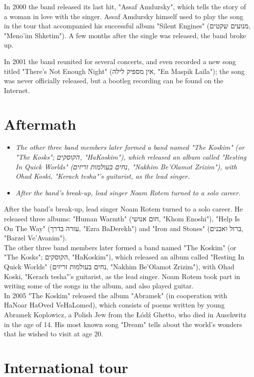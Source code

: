 In 2000 the band released its last hit, "Assaf Amdursky", which tells
the story of a woman in love with the singer. Assaf Amdursky himself
used to play the song in the tour that accompanied his successful album
"Silent Engines" (מנועים שקטים, "Meno'im Shketim"). A few months after
the single was released, the band broke up.

In 2001 the band reunited for several concerts, and even recorded a new
song titled "There's Not Enough Night" (אין מספיק לילה, "En Maspik
Laïla"); the song was never officially released, but a bootleg recording
can be found on the Internet.

\section{Aftermath}\label{aftermath}

\begin{itemize}
\item
  \emph{The other three band members later formed a band named "The
  Koskim" (or "The Kosks"; הקוסקים, "HaKoskim"), which released an album
  called "Resting In Quick Worlds" (נחים בעולמות זריזים, "Nakhim
  Be'Olamot Zrizim"), with Ohad Koski, "Kerach tesha"'s guitarist, as
  the lead singer.}
\item
  \emph{After the band's break-up, lead singer Noam Rotem turned to a
  solo career.}
\end{itemize}

After the band's break-up, lead singer Noam Rotem turned to a solo
career. He released three albums: "Human Warmth" (חום אנושי, "Khom
Enoshi"), "Help Is On The Way" (עזרה בדרך, "Ezra BaDerekh") and "Iron
and Stones" (ברזל ואבנים, "Barzel Ve'Avanim").\\
The other three band members later formed a band named "The Koskim" (or
"The Kosks"; הקוסקים, "HaKoskim"), which released an album called
"Resting In Quick Worlds" (נחים בעולמות זריזים, "Nakhim Be'Olamot
Zrizim"), with Ohad Koski, "Kerach tesha"'s guitarist, as the lead
singer. Noam Rotem took part in writing some of the songs in the album,
and also played guitar.\\
In 2005 "The Koskim" released the album "Abramek" (in cooperation with
HaNoar HaOved VeHaLomed), which consists of poems written by young
Abramek Koplowicz, a Polish Jew from the Łódź Ghetto, who died in
Auschwitz in the age of 14. His most known song "Dream" tells about the
world's wonders that he wished to visit at age 20.

\section{International tour}\label{international-tour}

